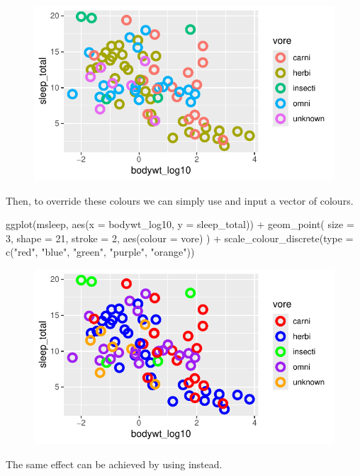 \begin{figure}[H]
\includegraphics[scale = .75]{graphics/ch2Figs/ggEx_21.pdf}
\end{figure}

\noindent
Then, to override these colours we can simply use  and input a vector of colours.

\begin{inR}
ggplot(msleep, aes(x = bodywt_log10, y = sleep_total)) +
  geom_point(
    size = 3, shape = 21, stroke = 2,
    aes(colour = vore)
  ) +
  scale_colour_discrete(type = c("red", "blue", "green", "purple", "orange"))
\end{inR}

\vspace{2em}

\begin{figure}[H]
\includegraphics[scale = .75]{graphics/ch2Figs/ggEx_22.pdf}
\end{figure}

The same effect can be achieved by using  instead.

